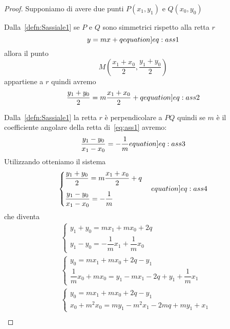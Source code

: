 \begin{proof}
	Supponiamo di avere due punti $P(x_1,y_1)$ e $Q(x_0,y_0)$
	
	 Dalla~\cref{defn:Sassiale1} se $P$ e $Q$ sono simmetrici rispetto alla retta $r$ 
	  \begin{equation}
	 y=mx+q\label[equation]{eq:ass1}
	 \end{equation}
	 allora il punto \[M\left(\frac{x_1+x_0}{2},\frac{y_1+y_0}{2}\right)\] appartiene a $r$ quindi avremo 
	 \begin{equation}
	 \dfrac{y_1+y_0}{2}=m\dfrac{x_1+x_0}{2}+q\label[equation]{eq:ass2}
	 \end{equation}
	 
	 Dalla~\cref{defn:Sassiale1} la retta $r$ è perpendicolare a $PQ$ quindi se $m$ è il coefficiente angolare della retta di~\cref{eq:ass1} avremo:\begin{equation}
	 \dfrac{y_1-y_0}{x_1-x_0}=-\dfrac{1}{m}\label[equation]{eq:ass3}
	 \end{equation}
	 Utilizzando  otteniamo il sistema
	 \begin{equation}
	 \begin{cases}
	 \dfrac{y_1+y_0}{2}=m\dfrac{x_1+x_0}{2}+q\\[0.4cm]
	 \dfrac{y_1-y_0}{x_1-x_0}=-\dfrac{1}{m}
	 \end{cases}\label[equation]{eq:ass4}
	 \end{equation}
	 che diventa
	  \begin{align*}
	 & \begin{cases}
	 y_1+y_0=mx_1+mx_0+2q\\
	 y_1-y_0=-\dfrac{1}{m}x_1+\dfrac{1}{m}x_0
	 \end{cases}\\
	 & \begin{cases}
	 y_0=mx_1+mx_0+2q-y_1\\
	 \dfrac{1}{m}x_0+mx_0= y_1-mx_1-2q+y_1+\dfrac{1}{m}x_1
	 \end{cases}\\
	 & \begin{cases}
	 y_0=mx_1+mx_0+2q-y_1\\
	 x_0+m^2x_0= my_1-m^2x_1-2mq+my_1+x_1
	 \end{cases}\\

\end{align*}
\end{proof}
